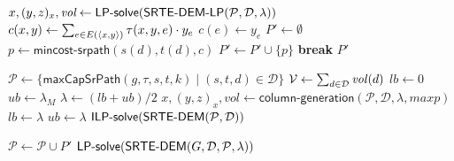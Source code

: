 \begin{algorithm}[t]
\small
\caption{$\textsf{iterate-CG}\left( G, \mathcal{P}, \mathcal{D}, \lambda, \textit{maxp} \right)$}
\begin{algorithmic}[1]
\STATE $x, (y, z)_x, \textit{vol} \gets \textsf{LP-solve}(\textsf{SRTE-DEM-LP}(\mathcal{P}, \mathcal{D}, \lambda))$ \label{line:mastersolve}
 \label{line:coststart}
  \STATE $c(x, y) \gets \sum_{e \in E(\langle x, y \rangle)} \tau(x, y, e) \cdot y_e$           
\ENDFOR
{}
  \STATE $c(e) \gets y_e$
\ENDFOR \label{line:costend}
\STATE $P' \gets \emptyset$
  \STATE $p \gets \textsf{mincost-srpath}(s(d), t(d), c)$
    \STATE $P' \gets P' \cup \{ p \}$
  \ENDIF
    \STATE \textbf{break}
  \ENDIF
\ENDFOR
\RETURN $P'$
\end{algorithmic}
\label{algo:iterate}
\end{algorithm}

\begin{algorithm}[t]
\small
\caption{$\textsf{binsearch-CG}\left( \mathcal{D}, \lambda_M, k, \epsilon, \textit{maxp} \right)$}
\begin{algorithmic}[1]
\STATE $\mathcal{P} \gets \{ \textsf{maxCapSrPath}(g, \tau, s, t, k) \mid (s, t, d) \in \mathcal{D} \}$ \label{line:init}
\STATE $\mathcal{V} \gets \sum_{d \in \mathcal{D}} \mathit{vol}(d)$
\STATE $lb \gets 0$
\STATE $ub \gets \lambda_M$
  \STATE $\lambda \gets (lb + ub) \slash 2$
  \STATE $x, (y, z)_x, \textit{vol} \gets \textsf{column-generation}(\mathcal{P}, \mathcal{D}, \lambda, \textit{maxp})$
    \STATE $lb \gets \lambda$
  \ELSE
    \STATE $ub \gets \lambda$
  \ENDIF
\ENDWHILE
\RETURN $\textsf{ILP-solve}(\textsf{SRTE-DEM}(\mathcal{P}, \mathcal{D}))$ 
\end{algorithmic}
\label{algo:SRGen}
\end{algorithm}

\begin{algorithm}[t]
\small
\caption{$\textsf{column-generation}\left( \mathcal{P}, \mathcal{D}, \lambda, \textit{maxp} \right)$}
\begin{algorithmic}[1]
{}
  \STATE $\mathcal{P} \gets \mathcal{P} \cup P'$
\ENDWHILE
\RETURN $\textsf{LP-solve}(\textsf{SRTE-DEM}(G, \mathcal{D}, \mathcal{P}, \lambda))$
\end{algorithmic}
\label{algo:colgen}
\end{algorithm}
